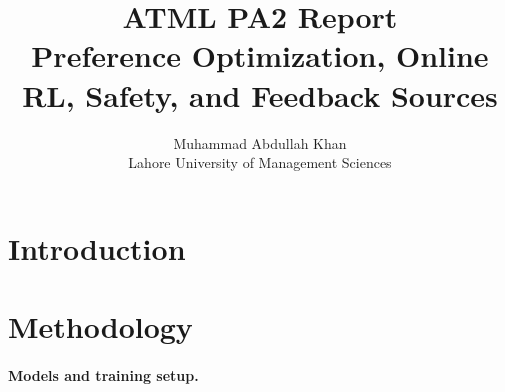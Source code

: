 \documentclass{article}
\title{
ATML PA2 Report\\
Preference Optimization, Online RL, Safety, and Feedback Sources
}
\author{
Muhammad Abdullah Khan\\
Lahore University of Management Sciences
}
\begin{document}
\maketitle



\begin{abstract}
%
%
%
\end{abstract}

\vspace{3pt}



\section{Introduction}

%

\vspace{3pt}



\section{Methodology}

\paragraph{Models and training setup.}
\end{document}
